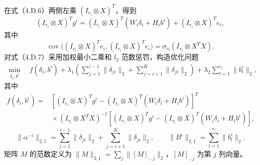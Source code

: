 在式（4.D.6）两侧左乘 $(I_{r_i}\otimes X)^T$，得到
\begin{equation}
(I_{r_i}\otimes X)^Tg^i
=(I_{r_i}\otimes X)^T(W_i\delta_i+H_ib^i)+(I_{r_i}\otimes X)^Te_i,\tag{4.D.7}
\end{equation}
其中
\[
\operatorname{cov}\bigl((I_{r_i}\otimes X)^Te_i,(I_{r_i}\otimes X)^Te_i\bigr)
=\sigma_{ii}(I_{r_i}\otimes X^TX).
\]
对式（4.D.7）采用加权最小二乘和 $l_2$ 范数惩罚，构造优化问题
\begin{equation}
\begin{aligned}
\min_{\delta_i,b^i}\quad f(\delta_i,b^i)
+\lambda_1\left(\sum_{j=1}^{i-1}\|\delta_{ji}\|_2
+\sum_{j=i+1}^{K}\|\delta_{ji}\|_2\right)
+\lambda_2\sum_{l=1}^{r_i}\|b_l^i\|_2,
\end{aligned}\tag{4.D.8}
\end{equation}
其中
\[
\begin{aligned}
f(\delta_i,b^i)={}&
[(I_{r_i}\otimes X)^Tg^i-(I_{r_i}\otimes X)^T(W_i\delta_i+H_ib^i)]^T\\
&{}\times(I_{r_i}\otimes X^TX)^{-1}
[(I_{r_i}\otimes X)^Tg^i-(I_{r_i}\otimes X)^T(W_i\delta_i+H_ib^i)],
\end{aligned}
\]
\[
\|\alpha^{-i}\|_{2,1}=\sum_{j=1}^{i-1}\|\delta_{ji}\|_2
+\sum_{j=i+1}^{K}\|\delta_{ji}\|_2,\qquad
\|B^i\|_{2,1}=\sum_{l=1}^{r_i}\|b_l^i\|_2.
\]
矩阵 $M$ 的范数定义为 $\|M\|_{2,1}=\sum_j\|[M]_{:,j}\|_2$，$[M]_{.,j}$ 为第 $j$ 列向量。

